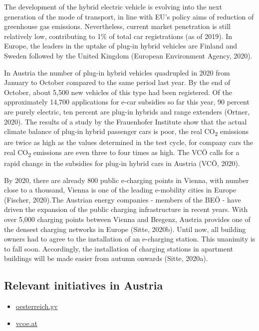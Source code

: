 \documentclass[
]{book}
\providecommand{\tightlist}{%
  \setlength{\itemsep}{0pt}\setlength{\parskip}{0pt}}
\begin{document}
The development of the hybrid electric vehicle is evolving into the next generation of the mode of transport, in line with EU's policy aims of reduction of greenhouse gas emissions. Nevertheless, current market penetration is still relatively low, contributing to 1\% of total car registrations (as of 2019). In Europe, the leaders in the uptake of plug-in hybrid vehicles are Finland and Sweden followed by the United Kingdom (European Environment Agency, 2020).

In Austria the number of plug-in hybrid vehicles quadrupled in 2020 from January to October compared to the same period last year. By the end of October, about 5,500 new vehicles of this type had been registered. Of the approximately 14,700 applications for e-car subsidies so far this year, 90 percent are purely electric, ten percent are plug-in hybrids and range extenders (Ortner, 2020).
The results of a study by the Frauenhofer Institute show that the actual climate balance of plug-in hybrid passenger cars is poor, the real CO\textsubscript{2} emissions are twice as high as the values determined in the test cycle, for company cars the real CO\textsubscript{2} emissions are even three to four times as high. The VCÖ calls for a rapid change in the subsidies for plug-in hybrid cars in Austria (VCÖ, 2020).

By 2020, there are already 800 public e-charging points in Vienna, with number close to a thousand, Vienna is one of the leading e-mobility cities in Europe (Fischer, 2020).The Austrian energy companies - members of the BEÖ - have driven the expansion of the public charging infrastructure in recent years. With over 5,000 charging points between Vienna and Bregenz, Austria provides one of the densest charging networks in Europe (Sitte, 2020b).
Until now, all building owners had to agree to the installation of an e-charging station. This unanimity is to fall soon. Accordingly, the installation of charging stations in apartment buildings will be made easier from autumn onwards (Sitte, 2020a).

\hypertarget{relevant-initiatives-in-austria-10}{%
\subsection*{Relevant initiatives in Austria}\label{relevant-initiatives-in-austria-10}}

\begin{itemize}
\tightlist
\item
  \href{https://www.oesterreich.gv.at/themen/bauen_wohnen_und_umwelt/elektroautos_und_e_mobilitaet/Seite.4320010.html}{oesterreich.gv}
\item
  \href{https://www.vcoe.at/presse/presseaussendungen/detail/vcoe-neue-studie-zeigt-schlechte-klimabilanz-von-plug-in-hybrid-pkw}{vcoe.at}
\end{itemize}
\end{document}

